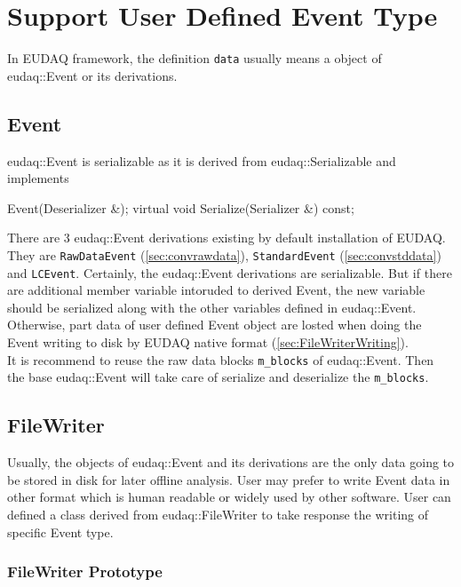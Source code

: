 \section{Support User Defined Event Type}\label{sec:NewDataHandling}
In EUDAQ framework, the definition \texttt{data} usually means a object of eudaq::Event or its derivations. 

\subsection{Event}
eudaq::Event is serializable as it is derived from eudaq::Serializable and implements
\begin{listing}
  Event(Deserializer &);
  virtual void Serialize(Serializer &) const;    
\end{listing}

There are 3 eudaq::Event derivations existing by default installation of EUDAQ. They are \lstinline[style=cpp]{RawDataEvent} (\autoref{sec:convrawdata}), \lstinline[style=cpp]{StandardEvent} (\autoref{sec:convstddata}) and \lstinline[style=cpp]{LCEvent}. Certainly, the eudaq::Event derivations are serializable. But if there are additional member variable intoruded to derived Event, the new variable should be serialized along with the other variables defined in eudaq::Event. Otherwise, part data of user defined Event object are losted when doing the Event writing to disk by EUDAQ native format (\autoref{sec:FileWriterWriting}).\\

It is recommend to reuse the raw data blocks \lstinline[style=cpp]{m_blocks} of eudaq::Event. Then the base eudaq::Event will take care of serialize and deserialize the \lstinline[style=cpp]{m_blocks}.\\

\subsection{FileWriter}\label{sec:FileWriterWriting}
Usually, the objects of eudaq::Event and its derivations are the only data going to be stored in disk for later offline analysis. User may prefer to write Event data in other format which is human readable or widely used by other software. User can defined a class derived from eudaq::FileWriter to take response the writing of specific Event type.

\subsubsection{FileWriter Prototype}


